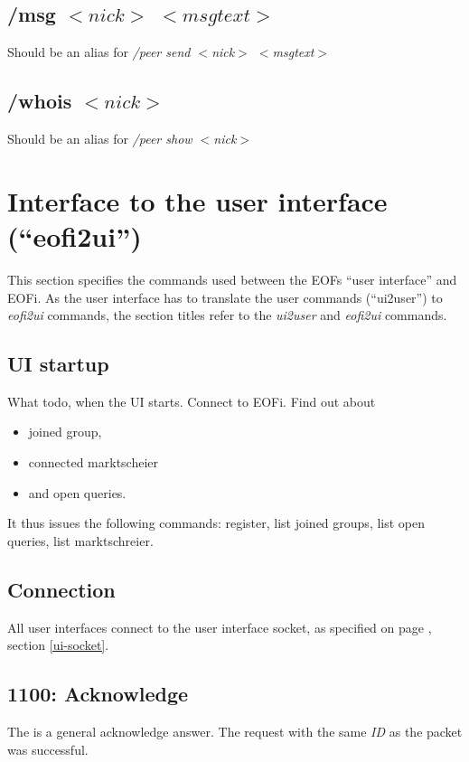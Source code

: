 \documentclass[12pt,a4paper]{book}
\begin{document}
\subsection{/msg $<nick>$ $<msgtext>$}
Should be an alias for \textit{/peer send $<$nick$>$ $<$msgtext$>$}
\subsection{/whois $<nick>$}
Should be an alias for \textit{/peer show $<$nick$>$}


\section{Interface to the user interface ("`eofi2ui"')}
\label{eofi2ui}
This section specifies the commands used between the EOFs
"`user interface"' and EOFi. As the user interface has to translate
the user commands ("`ui2user"') to \emph{eofi2ui} commands, the
section titles refer to the \emph{ui2user} and \emph{eofi2ui} commands.
\subsection{UI startup}
What todo, when the UI starts.
Connect to EOFi. Find out about
\begin{itemize}
\item joined group,
\item connected marktscheier
\item and open queries.
\end{itemize}
It thus issues the following commands:
register, list joined groups, list open queries, list marktschreier.
\subsection{Connection}
All user interfaces connect to the user interface socket, as specified
on page \pageref{ui-socket}, section \ref{ui-socket}.
\subsection{1100: Acknowledge}
The is a general acknowledge answer. The request with the
same \emph{ID} as the packet was successful.
\end{document}
